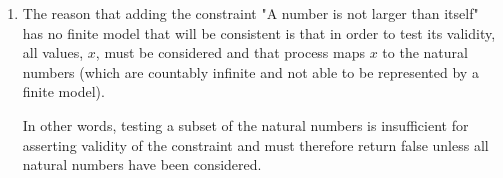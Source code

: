 \documentclass[12pt]{article}
\begin{document}
\begin{enumerate}[label=(\alph*)]
	\item The reason that adding the constraint "A number is not larger than itself" has no finite
		model that will be consistent is that in order to test its validity, all values, \(x\), must
		be considered and that process maps \(x\) to the natural numbers (which are countably infinite
		and not able to be represented by a finite model).

		In other words, testing a subset of the natural numbers is insufficient for asserting validity
		of the constraint and must therefore return false unless all natural numbers have been considered.
\end{enumerate}
\end{document}
